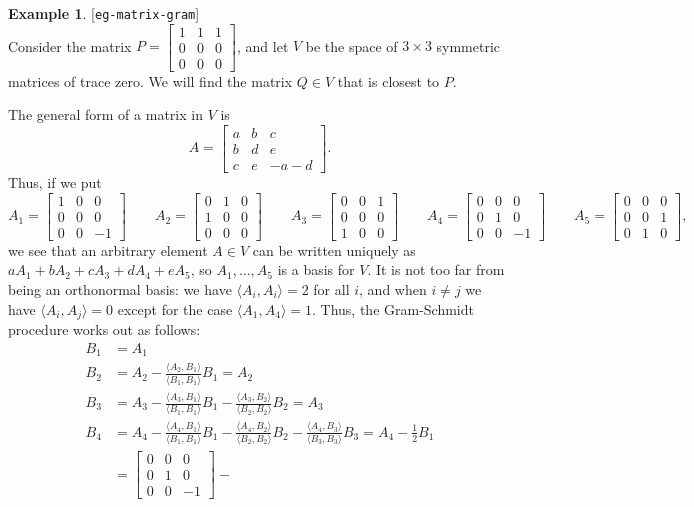 \documentclass{amsart}
\newcommand{\lbl}[1]{\label{#1}\textup{[\texttt{#1}]}\ \\}
\newcommand{\lbl}{\label}
\newcommand{\bsm}       {\left[\begin{smallmatrix}}
\newcommand{\esm}       {\end{smallmatrix}\right]}
\newcommand{\tm}        {\times}
\newcommand{\ip}[1]     {\langle #1\rangle}
\renewcommand{\:}       {\colon}
\theoremstyle{definition}
\newtheorem{example}[theorem]{Example}
\begin{document}
\begin{example}\lbl{eg-matrix-gram}
 Consider the matrix $P=\bsm 1&1&1 \\ 0&0&0 \\ 0&0&0\esm$, and
 let $V$ be the space of $3\tm 3$ symmetric matrices of trace zero.
 We will find the matrix $Q\in V$ that is closest to $P$.

 The general form of a matrix in $V$ is 
 \[ A = \bsm a & b & c \\ b & d & e \\ c & e & -a-d \esm. \]
 Thus, if we put 
 \[ 
  A_1 = \bsm 1 & 0 & 0 \\ 0 & 0 & 0 \\ 0 & 0 & -1 \esm \hspace{2em}
  A_2 = \bsm 0 & 1 & 0 \\ 1 & 0 & 0 \\ 0 & 0 &  0 \esm \hspace{2em}
  A_3 = \bsm 0 & 0 & 1 \\ 0 & 0 & 0 \\ 1 & 0 &  0 \esm \hspace{2em}
  A_4 = \bsm 0 & 0 & 0 \\ 0 & 1 & 0 \\ 0 & 0 & -1 \esm \hspace{2em}
  A_5 = \bsm 0 & 0 & 0 \\ 0 & 0 & 1 \\ 0 & 1 &  0 \esm, 
 \] 
 we see that an arbitrary element $A\in V$ can be written uniquely as
 $aA_1+bA_2+cA_3+dA_4+eA_5$, so $A_1,\dotsc,A_5$ is a basis for $V$.
 It is not too far from being an orthonormal basis: we have
 $\ip{A_i,A_i}=2$ for all $i$, and when $i\neq j$ we have
 $\ip{A_i,A_j}=0$ except for the case $\ip{A_1,A_4}=1$.  Thus, the
 Gram-Schmidt procedure works out as follows:
 \begin{align*}
   B_1 &= A_1 \\
   B_2 &= A_2 - \frac{\ip{A_2,B_1}}{\ip{B_1,B_1}}B_1 = A_2 \\   
   B_3 &= A_3 - \frac{\ip{A_3,B_1}}{\ip{B_1,B_1}}B_1
              - \frac{\ip{A_3,B_2}}{\ip{B_2,B_2}}B_2 = A_3 \\   
   B_4 &= A_4 - \frac{\ip{A_4,B_1}}{\ip{B_1,B_1}}B_1
              - \frac{\ip{A_4,B_2}}{\ip{B_2,B_2}}B_2 
              - \frac{\ip{A_4,B_3}}{\ip{B_3,B_3}}B_3 
        = A_4 - \frac{1}{2}B_1 \\
       &= \bsm 0 & 0 & 0 \\ 0 & 1 & 0 \\ 0 & 0 & -1 \esm - 

\end{align*}
\end{example}
\end{document}
